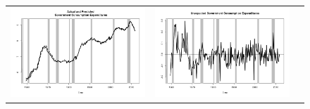 \documentclass[12pt]{article}
\begin{document}
\begin{figure}
\begin{center}
\begin{tabular}{ccc}
\includegraphics[scale=0.34]{pics/govcons.png} & \includegraphics[scale=0.34]{pics/unexp_govcons.png}  \\ 
\end{tabular}
\end{center}
\end{figure}
\end{document}

